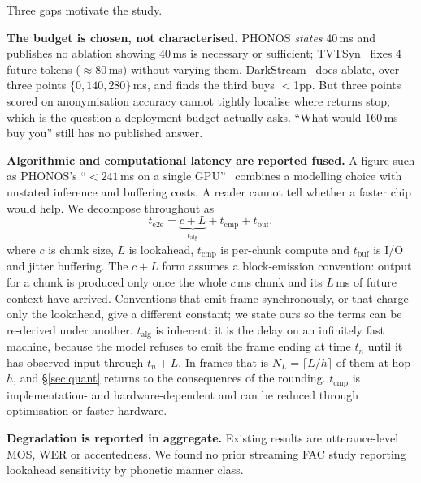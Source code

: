 \documentclass[journal]{IEEEtran}
\newcommand{\talg}{\ensuremath{t_{\mathrm{alg}}}}
\newcommand{\tcmp}{\ensuremath{t_{\mathrm{cmp}}}}
\newcommand{\tbuf}{\ensuremath{t_{\mathrm{buf}}}}
\begin{document}
Three gaps motivate the study.

\textbf{The budget is chosen, not characterised.} PHONOS \emph{states} 40\,ms
and publishes no ablation showing 40\,ms is necessary or sufficient;
TVTSyn~\cite{tvtsyn2026} fixes 4 future tokens ($\approx$80\,ms) without
varying them. DarkStream~\cite{darkstream2025} does ablate, over three points
$\{0, 140, 280\}$\,ms, and finds the third buys
$<$1pp. But three points scored on anonymisation accuracy cannot tightly
localise where returns stop, which is the question a deployment budget actually asks.
``What would 160\,ms buy you'' still has no published answer.

\textbf{Algorithmic and computational latency are reported fused.} A figure
such as PHONOS's ``${<}241$\,ms on a single GPU''~\cite{phonos2026} combines a
modelling choice with
unstated inference and buffering costs. A reader cannot tell whether a faster
chip would help. We decompose throughout as
\begin{equation}
t_{\mathrm{e2e}} = \underbrace{c + L}_{t_{\mathrm{alg}}} + t_{\mathrm{cmp}} + t_{\mathrm{buf}},
\label{eq:decomp}
\end{equation}
where $c$ is chunk size, $L$ is lookahead, \tcmp{} is per-chunk compute and
\tbuf{} is I/O and jitter buffering. The $c{+}L$ form assumes a block-emission
convention: output for a chunk is produced only once the whole $c$\,ms chunk
and its $L$\,ms of future context have arrived. Conventions that emit
frame-synchronously, or that charge only the lookahead, give a different
constant; we state ours so the terms can be re-derived under another. \talg{} is inherent: it is the delay on an
infinitely fast machine, because the model refuses to emit the frame ending at
time $t_n$ until it has observed input through $t_n{+}L$. In frames that is
$N_L=\lceil L/h\rceil$ of them at hop $h$, and \S\ref{sec:quant} returns to the
consequences of the rounding. \tcmp{} is implementation- and hardware-dependent and can be
reduced through optimisation or faster hardware.

\textbf{Degradation is reported in aggregate.} Existing results are
utterance-level MOS, WER or accentedness. We found no prior streaming FAC study
reporting lookahead sensitivity by phonetic manner class.
\end{document}
